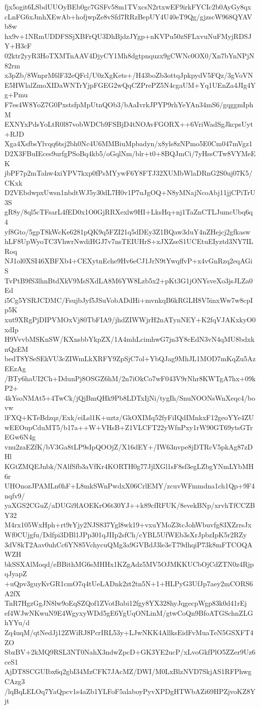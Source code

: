 fjx5ogit6LSbdUUOyBEb0gc7GSFv58m1TVxcsN2rtxwEF9irkFYCIc2b0AyGy8qx
cLnFG6xJmhXEwAb+hofjwpZe8vSfd7RRzBepUY4U40eT9Qg/gjzscW968QYAVb8w
hx9v+1NRmUDDFSSjXBFrQU3DhBjdzJYgp+nKVPu50zSFLxvuNuFMyjRDSJY+H3cF
02ktr2yyR3HoTXMTnAAV4DjyCY1Mh8dgtpnquzx9gCWNc0OX0/Xn7bYnNPjN82rm
x3pZb/8WnprM6lF32eQFcl/U0zXgKets+/H43boZb3ottqJpkpydV5FQz/3gVoVN
E5HWlalZmoXIDaWNTrYjpFGEG2wQqCZPrePZ5N4cgaUM+Yq1UEnZa4JIg4Yg+Pmu
F7es4W8YoZ7G0PxstsfpMpUtnQOb3/bAaIvrkJPYP9rhYeYAn34mS6/gqggmIphM
EXNYxPdsYoLtR0l87vobWDCb9FSBjD4tNOAvFGORX++6VriWadSgJkcpsUyt+RJD
Xga4XsfbsYlvqq6tsj2bh0Nc4U6MMBiuMpbadyn/x8yls8zNPmo5E0Cm047mVgz1
D2X3FBuIEces9urfgPSoBq4kb5/oGqlNm/blr+t0+8BQJmCi/7yHssCTw8VYMeEK
jbPF7p2mTahw4xiYPV7kxp0fPsMYywF6Y8FTJ32XUMbWlaDRnG2S0uj07K5/CKxk
D2VEbdwpxUwsn1nbdtWJ5y30dL7H0v1P7uJgOQ+N8yMNajNcoAbj11jjCPiTrU3S
gR8y/8ql5cTFsarL4fED0x1O0GjRRXexlw9HI+LksHq+nj1TaZnCTLJumcUbq6q4
yf8Gto/5gpT8kWcKe6281pQK9q5FZI21q5dDEy3Z1BQaw3duY4nZHejcj2gfkasw
hLF8UpWyoTC3VhwrNwdiHGJ7v7nsTEIUHrS+xJXZseS1UCEtuEIyztd3NY7ILRoq
NJ1ol0XSI46XBFXb4+CEXytnEche9Hv6eCJ1JrN9tYwqffvP+x4vGnRzq2eqAGiS
TvPtB9fS3lhnBtdXkV9MsSXdLA8M6YW8Lzb5x2+pKt3G1jONYsveXo3jsJLZa0Ed
i5Cg5YSRJCDMC/FsujbJyf5JSuVobADdHi+mvnkqB6kRGLH8V5inxWw7w8cpIp5K
xut9XRgPjDIPVMOxVj80TbFIA9/jhdZIWWjrH2nATynNEY+K2fqVJAKxkyO0xdIp
H9VvvbMSKnSW/KXnsbbYkpZX/1A4mhLcimhwG7jn3Y8cEdN3vN4qMU8bdxknQzEM
bedT8YSeSEkVU3cZIWmLkXRFY9ZpSjC7ol+YbQJag9MhJL1MOD7mKqZu5AzEEzAg
/BTy6haUI2Ch+DdunPj8OSGZ6hM/2n7iOkCo7wF043V9rNhr8KWTgA7hx+09kP2+
4kYsoNMAt5+4TwCk/jQjBmQHk9Pb8LDTxIjNi/tygIh/SnuNOONsWnXeqc4/bovw
lFXQ+KTeBdzqz/Exk/eiLsl1K+uztz/GkOXIMq52fyFiIQdIMnkxF12geoYYe4ZU
wEEOupCduMT5/b17a++W+VHsB+Z1VLCFT22yWfnPxy1rW90GT69ytsGTrEGw6N4g
vnu2zaEZfK/bV3Ga8tLP9sIpQOOjZ/X16dEY+/IW63nvpe8jDTRcV5pkAg87zDHl
KGtZMQEJnbk/NAlfSfb3aVfKr4KORTH0g77JjlXGl1sF8sf3egLZbgYNmLYbMH6r
UHOnozJPAMLn0hF+L8mkSWnPwdxX06CrlEMY/zcuvWFmmdna1ch1Qp+9F4nqfv9/
yaXGS2CGuZ/aDUGi9lAOEKrO6t30YJ++k89cfRFUK/8evekBNp/xrvhTfCCZBY32
M4rx105WxHph+rt9rYjy2NJS837Ygl8wk19+vxuYMoZ3tcJohWbuvfg83XZrrsJx
Wf0CUjgfu/Ddfpi3DBl1JPp301qJIIp2sfCh/cYBL5UfWEb3sXrJpbzIpK5r2RZy
3dV8kT2Aav0uhCc6YN85VchycuQMg3a9GVBdJ3le3eT79dhqiP73k8mFTCOQAWZH
bkSSXAlMoqd/eBBithMG6sMHHx1KZgAdz5MV5OJMKKUCbOjCdZTN0z4RjpqJyapZ
+uQpv3guyKvGR1cmO7q4tUeLADnk2zt2tn5N+1+HLPyG3UfJp7aey2mCORS6A2fX
TnR7HgzGgJN8lw9oEqSZQof1ZVotBabi12fgy8YX328hyJqgecpWgp83k0d41rEj
ef4WJwNKwuN9E4WgyxyWDd5gE6YgUqONLinM/gtwCoQn9BfoATGSchnZLGhYYu/d
Zq4uqM/qtNedJj12ZWiRJ8PcrIRL53y+LJwNKK4AllksEidFvMuaTeN5GSXFT4ZO
SbzBV+2kMQ9RSL3NT0NahX3ndwZpcD+GK3YE2ucP/xLvoGkfPlO5ZZer9Uz6ceS1
AjDT8SCGUIbx6q2gbI34MzCFK7JAcMZ/DWI/M0LxBlzNVD7SkjAS1RFPhwgCAzg3
/lqBqLELOq7YaQpcv1s4aZb1YLFoF5alaboyPyvXPDgHTWbAZi69HPZjvoKZ8Yjt
